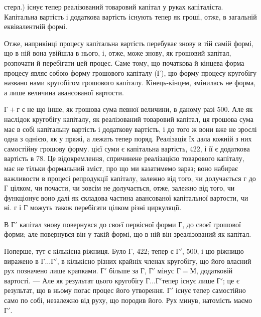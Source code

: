 \parcont{}  %
стерл.) існує тепер реалізований товаровий капітал у руках капіталіста.
Капітальна вартість і додаткова вартість існують тепер як гроші,
отже, в загальній еквівалентній формі.

Отже, наприкінці процесу капітальна вартість перебуває знову
в тій самій формі, що в ній вона увійшла в нього, і, отже, може знову,
як грошовий капітал, розпочати й перебігати цей процес. Саме тому, що
початкова й кінцева форма процесу являє собою форму грошового капіталу
($Г$), цю форму процесу кругобігу названо нами кругобігом
грошового капіталу. Кінець-кінцем, змінилась не форма, а лише величина
авансованої вартости.

$Г + г$ є не що інше, як грошова сума певної величини, в даному разі
500. Але як наслідок кругобігу капіталу, як реалізований
товаровий капітал, ця грошова сума має в собі капітальну вартість
і додаткову вартість, і до того ж вони вже не зрослі одна з однією, як
у пряжі, а лежать тепер поряд. Реалізація їх дала кожній з них самостійну
грошову форму.  цієї суми є капітальна вартість, 422, і  її є додаткова вартість в 78. Це відокремлення,
спричинене реалізацією товарового капіталу, має не тільки формальний
зміст, про що ми казатимемо зараз; воно набирає важливости в процесі
репродукції капіталу, залежно від того, чи долучається $г$ до $Г$ цілком, чи
почасти, чи зовсім не долучається, отже, залежно від того, чи функціонує
воно далі як складова частина авансованої капітальної вартости, чи ні.
$г$ і $Г$ можуть також перебігати цілком різні циркуляції.

В $Г'$ капітал знову повернувся до своєї первісної форми $Г$, до своєї
грошової форми; але повернувся він у такій формі, що в ній він зреалізований
як капітал.

Поперше, тут є кількісна ріжниця. Було $Г$, 422; тепер є $Г'$,
500, і цю ріжницю виражено в $Г\dots{} Г'$, в кількісно різних
крайніх членах кругобігу, що його власний рух позначено лише крапками.
$Г'$ більше за $Г$, $Г'$ мінус $Г = М$, додатковій вартості. — Але як результат цього
кругобігу $Г\dots{} Г' т$епер існує лише $Г'$; це є результат, що в ньому погас
процес його утворення. $Г'$ існує тепер самостійно само по собі, незалежно
від руху, що породив його. Рух минув, натомість маємо $Г'$.

